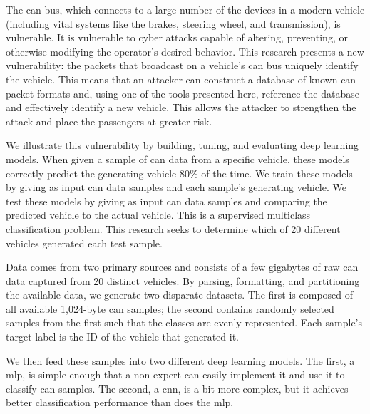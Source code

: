 \documentclass[../main.tex]{subfiles}
\begin{document}

The \ac{can} bus, which connects to a large number of the devices in a modern vehicle (including vital systems like the brakes, steering wheel, and transmission), is vulnerable. It is vulnerable to cyber attacks capable of altering, preventing, or otherwise modifying the operator's desired behavior. This research presents a new vulnerability: the packets that broadcast on a vehicle's \ac{can} bus uniquely identify the vehicle. This means that an attacker can construct a database of known \ac{can} packet formats and, using one of the tools presented here, reference the database and effectively identify a new vehicle. This allows the attacker to strengthen the attack and place the passengers at greater risk.


We illustrate this vulnerability by building, tuning, and evaluating deep learning models. When given a sample of \ac{can} data from a specific vehicle, these models correctly predict the generating vehicle 80\% of the time. We train these models by giving as input \ac{can} data samples and each sample's generating vehicle. We test these models by giving as input \ac{can} data samples and comparing the predicted vehicle to the actual vehicle. This is a supervised multiclass classification problem. This research seeks to determine which of 20 different vehicles generated each test sample.


Data comes from two primary sources and consists of a few gigabytes of raw \ac{can} data captured from 20 distinct vehicles. By parsing, formatting, and partitioning the available data, we generate two disparate datasets. The first is composed of all available 1,024-byte \ac{can} samples; the second contains randomly selected samples from the first such that the classes are evenly represented. Each sample's target label is the ID of the vehicle that generated it.


We then feed these samples into two different deep learning models. The first, a \ac{mlp}, is simple enough that a non-expert can easily implement it and use it to classify \ac{can} samples. The second, a \ac{cnn}, is a bit more complex, but it achieves better classification performance than does the \ac{mlp}.

\end{document}
